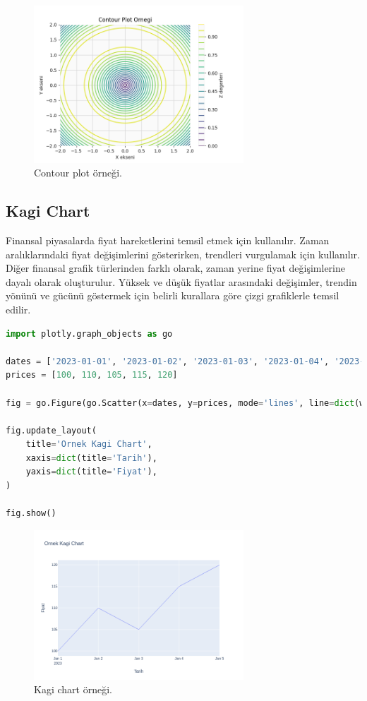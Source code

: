 \begin{figure}[h]
    \centering
    \includegraphics[width=0.7\textwidth]{images/contour_plot.png}
    \caption{Contour plot örneği.}
    \label{fig:enter-label}
\end{figure}

\newpage

\subsection{Kagi Chart}
Finansal piyasalarda fiyat hareketlerini temsil etmek için kullanılır. Zaman aralıklarındaki fiyat değişimlerini gösterirken, trendleri vurgulamak için kullanılır. Diğer finansal grafik türlerinden farklı olarak, zaman yerine fiyat değişimlerine dayalı olarak oluşturulur. Yüksek ve düşük fiyatlar arasındaki değişimler, trendin yönünü ve gücünü göstermek için belirli kurallara göre çizgi grafiklerle temsil edilir.

\begin{lstlisting}[language=Python]
import plotly.graph_objects as go

dates = ['2023-01-01', '2023-01-02', '2023-01-03', '2023-01-04', '2023-01-05']
prices = [100, 110, 105, 115, 120]

fig = go.Figure(go.Scatter(x=dates, y=prices, mode='lines', line=dict(width=1)))

fig.update_layout(
    title='Ornek Kagi Chart',
    xaxis=dict(title='Tarih'),
    yaxis=dict(title='Fiyat'),
)

fig.show()
\end{lstlisting}

\begin{figure}[h]
    \centering
    \includegraphics[width=0.7\textwidth]{images/kagi_chart.png}
    \caption{Kagi chart örneği.}
    \label{fig:enter-label}
\end{figure}

